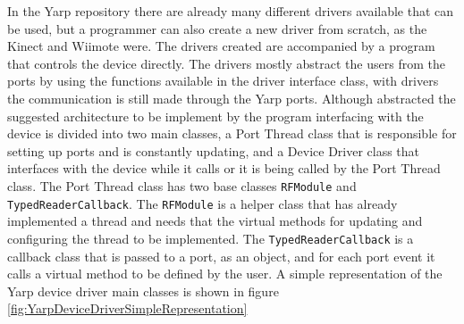 	In the Yarp repository there are already many different drivers available that can be used, but a programmer can also create a new driver from scratch, as the Kinect and \ac{Wiimote} were. The drivers created are accompanied by a program that controls the device directly. The drivers mostly abstract the users from the ports by using the functions available in the driver interface class, with drivers the communication is still made through the Yarp ports. Although abstracted the suggested architecture to be implement by the program interfacing with the device is divided into two main classes, a Port Thread class that is responsible for setting up ports and is constantly updating, and a Device Driver class that interfaces with the device while it calls or it is being called by the Port Thread class. The Port Thread class has two base classes \texttt{RFModule} and \texttt{TypedReaderCallback}. The \texttt{RFModule} is a helper class that has already implemented a thread and needs that the virtual methods for updating and configuring the thread to be implemented. The \texttt{TypedReaderCallback} is a callback class that is passed to a port, as an object, and for each port event it calls a virtual method to be defined by the user. A simple representation of the Yarp device driver main classes is shown in figure \ref{fig:YarpDeviceDriverSimpleRepresentation}
		
